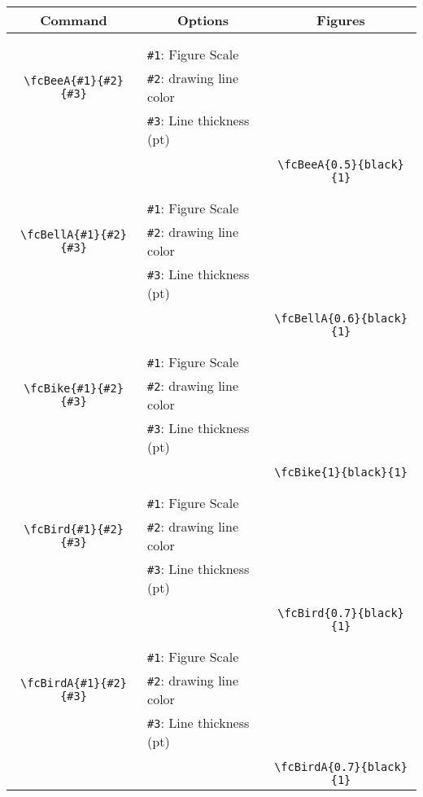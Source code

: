 \documentclass[x11names]{article}
\begin{document}
\begin{table}[H]\centering\begin{tabular}{|c|l|c|}\hline {\bf Command}& \multicolumn{1}{c|}{{\bf Options}} & {\bf Figures}\\  \hline	&&\multirow{5}{*}{\fcBeeA{0.5}{black}{1}}\\	&&\\	&\verb|#1|: Figure Scale &\\	\verb|\fcBeeA{#1}{#2}{#3}|&	\verb|#2|: drawing line color &\\	&\verb|#3|: Line thickness (pt) &\\ &&\\&&	\verb|\fcBeeA{0.5}{black}{1}|\\\hline 	
	&&\multirow{5}{*}{\fcBellA{0.6}{black}{1}}\\	&&\\	&\verb|#1|: Figure Scale &\\	\verb|\fcBellA{#1}{#2}{#3}|&	\verb|#2|: drawing line color &\\	&\verb|#3|: Line thickness (pt) &\\ &&\\&&	\verb|\fcBellA{0.6}{black}{1}|\\\hline 	
	&&\multirow{5}{*}{\fcBike{1}{black}{1}}\\	&&\\	&\verb|#1|: Figure Scale &\\	\verb|\fcBike{#1}{#2}{#3}|&	\verb|#2|: drawing line color &\\	&\verb|#3|: Line thickness (pt) &\\ &&\\&&	\verb|\fcBike{1}{black}{1}|\\\hline 	
	&&\multirow{5}{*}{\fcBird{0.7}{black}{1}}\\	&&\\	&\verb|#1|: Figure Scale &\\	\verb|\fcBird{#1}{#2}{#3}|&	\verb|#2|: drawing line color &\\	&\verb|#3|: Line thickness (pt) &\\ &&\\&&	\verb|\fcBird{0.7}{black}{1}|\\\hline 	
	&&\multirow{5}{*}{\fcBirdA{0.7}{black}{1}}\\	&&\\	&\verb|#1|: Figure Scale &\\	\verb|\fcBirdA{#1}{#2}{#3}|&	\verb|#2|: drawing line color &\\	&\verb|#3|: Line thickness (pt) &\\ &&\\&&	\verb|\fcBirdA{0.7}{black}{1}|\\\hline 	

\end{tabular}
\end{table}
\end{document}
